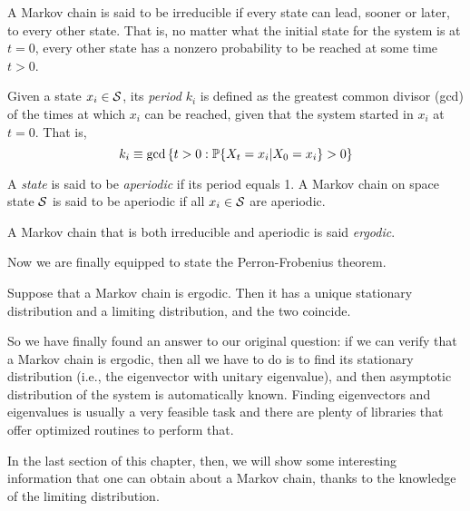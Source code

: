 \begin{ndef} 
    A Markov chain is said to be irreducible if every state can lead, sooner or later, to every other state. That is, no matter what the initial state for the system is at $t=0$, every other state has a nonzero probability to be reached at some time $t>0$.
\end{ndef}
\begin{ndef} 
    Given a state $x_i \in \mathcal{S}$, its \emph{period} $k_i$ is defined as the greatest common divisor (gcd) of the times at which $x_i$ can be reached, given that the system started in $x_i$ at $t=0$. That is,
    \begin{equation}
        k_i \equiv \text{gcd} \left\{ t>0 : \mathbb{P}\{X_t = x_i | X_0 = x_i\} > 0 \right\}
    \end{equation}
    
\end{ndef}
\begin{ndef} [Aperiodicity]
    A \emph{state} is said to be \emph{aperiodic} if its period equals 1. A Markov chain on space state $\mathcal{S}$ is said to be aperiodic if all $x_i \in \mathcal{S}$ are aperiodic. 
\end{ndef}
\begin{ndef} [Ergodicity]
    A Markov chain that is both irreducible and aperiodic is said \emph{ergodic}.
\end{ndef}
Now we are finally equipped to state the Perron-Frobenius theorem.

\begin{theorem} \label{th:perron-frobenius}
    Suppose that a Markov chain is ergodic. Then it has a unique stationary distribution and a limiting distribution, and the two coincide.
\end{theorem}

\medskip
So we have finally found an answer to our original question: if we can verify that a Markov chain is ergodic, then all we have to do is to find its stationary distribution (i.e., the eigenvector with unitary eigenvalue), and then asymptotic distribution of the system is automatically known. Finding eigenvectors and eigenvalues is usually a very feasible task and there are plenty of libraries that offer optimized routines to perform that.

In the last section of this chapter, then, we will show some interesting information that one can obtain about a Markov chain, thanks to the knowledge of the limiting distribution.

